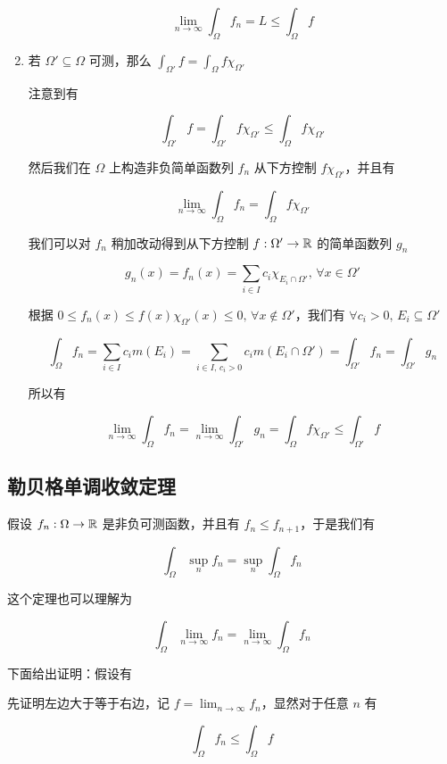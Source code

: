 \begin{enumerate}
    \[
    \lim_{n \to \infty}\int_{\Omega} f_n = L \le \int_{\Omega} f
    \]

    \item 若 $\Omega' \subseteq \Omega$ 可测，那么 $\int_{\Omega'}f = \int_{\Omega} f\chi_{\Omega'}$

    注意到有

    \[
        \int_{\Omega'}f = \int_{\Omega'}f\chi_{\Omega'} \le \int_{\Omega}f\chi_{\Omega'}
    \]

    然后我们在 $\Omega$ 上构造非负简单函数列 $f_n$ 从下方控制  $f \chi_{\Omega'}$，并且有

    \[
        \lim_{n \to \infty}\int_{\Omega} f_n = \int_{\Omega}f \chi_{\Omega'}
    \]

    我们可以对 $f_n$ 稍加改动得到从下方控制 $f: \Omega' \to \mathbb{R}$ 的简单函数列 $g_n$

    \[
        g_n(x) = f_n(x) = \sum_{i \in I} c_i \chi_{E_i \cap \Omega'},\, \forall x \in \Omega'
    \]

    根据 $0 \le f_n(x) \le f(x)\chi_{\Omega'}(x) \le 0,\, \forall x \notin \Omega'$，我们有 $\forall c_i >0,\, E_i \subseteq \Omega'$

    \[
        \int_{\Omega} f_n = \sum_{i \in I} c_i m(E_i) = \sum_{i \in I,\, c_i > 0} c_i m(E_i \cap \Omega') = \int_{\Omega'}f_n = \int_{\Omega'}g_n
    \]

    所以有

    \[
        \lim_{n \to \infty}\int_{\Omega} f_n = \lim_{n \to \infty}\int_{\Omega'}g_n = \int_{\Omega}f \chi_{\Omega'} \le \int_{\Omega'}f 
    \]

\end{enumerate}

\subsection{勒贝格单调收敛定理}

假设 $f_n: \Omega \to \mathbb{R}$ 是非负可测函数，并且有 $f_n \le f_{n+1} $，于是我们有

\[
\int_{\Omega} \sup_{n} f_n = \sup _{n} \int_{\Omega} f_n
\]

这个定理也可以理解为

\[
\int_{\Omega} \lim_{n \to \infty} f_n = \lim_{n \to \infty} \int_{\Omega} f_n
\]

下面给出证明：假设有

先证明左边大于等于右边，记 $f = \lim_{n \to \infty} f_n$，显然对于任意 $n$ 有

\[
\int_{\Omega} f_n \le \int_{\Omega} f
\]

